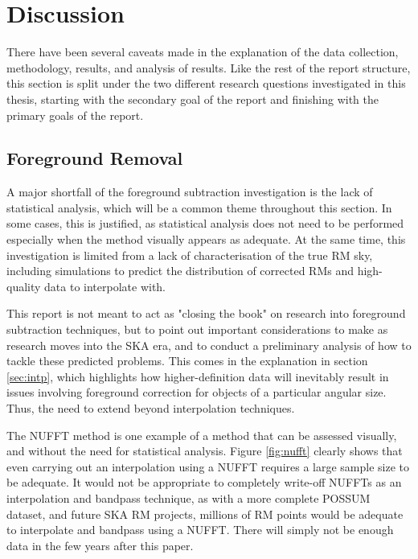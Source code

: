 \chapter{Discussion}
\label{cha:discussion}

There have been several caveats made in the explanation of the data collection, methodology, results, and analysis of results. Like the rest of the report structure, this section is split under the two different research questions investigated in this thesis, starting with the secondary goal of the report and finishing with the primary goals of the report.

\section{Foreground Removal}
\label{sec:fr_disc}

A major shortfall of the foreground subtraction investigation is the lack of statistical analysis, which will be a common theme throughout this section. In some cases, this is justified, as statistical analysis does not need to be performed especially when the method visually appears as adequate. At the same time, this investigation is limited from a lack of characterisation of the true RM sky, including simulations to predict the distribution of corrected RMs and high-quality data to interpolate with.


This report is not meant to act as "closing the book" on research into foreground subtraction techniques, but to point out important considerations to make as research moves into the SKA era, and to conduct a preliminary analysis of how to tackle these predicted problems. This comes in the explanation in section \ref{sec:intp}, which highlights how higher-definition data will inevitably result in issues involving foreground correction for objects of a particular angular size. Thus, the need to extend beyond interpolation techniques.


The NUFFT method is one example of a method that can be assessed visually, and without the need for statistical analysis. Figure \ref{fig:nufft} clearly shows that even carrying out an interpolation using a NUFFT requires a large sample size to be adequate. It would not be appropriate to completely write-off NUFFTs as an interpolation and bandpass technique, as with a more complete POSSUM dataset, and future SKA RM projects, millions of RM points would be adequate to interpolate and bandpass using a NUFFT. There will simply not be enough data in the few years after this paper.


